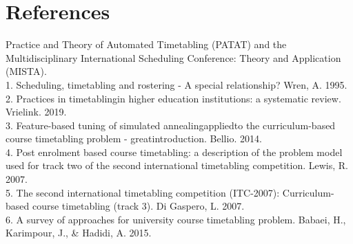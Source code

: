 \documentclass[a4paper]{report}
\begin{document}
\section*{References}

Practice and Theory of Automated Timetabling (PATAT) and the Multidisciplinary International Scheduling Conference: Theory and Application (MISTA). \\
1. Scheduling, timetabling and rostering - A special relationship? Wren, A. 1995. \\
2. Practices in timetablingin higher education institutions: a systematic review. Vrielink. 2019. \\
3. Feature-based tuning of simulated annealingappliedto the curriculum-based course timetabling problem - greatintroduction. Bellio. 2014. \\
4. Post enrolment based course timetabling: a description of the problem model used for track two of the second international timetabling competition. Lewis, R. 2007. \\
5. The second international timetabling competition (ITC-2007): Curriculum-based course timetabling (track 3). Di Gaspero, L. 2007. \\
6. A survey of approaches for university course timetabling problem. Babaei, H., Karimpour, J., \& Hadidi, A. 2015. \\
\end{document}
